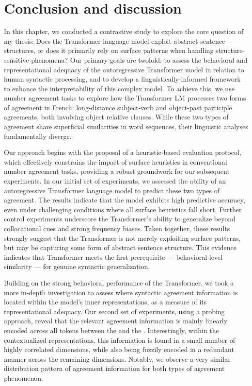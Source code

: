 \section{Conclusion and discussion} \label{sec:conclu_main_projct}
In this chapter, we conducted a contrastive study to explore the core question of my thesis: Does the Transformer language model exploit abstract sentence structures, or does it primarily rely on surface patterns when handling structure-sensitive phenomena? Our primary goals are twofold: to assess the behavioral and representational adequacy of the autoregressive Transformer model in relation to human syntactic processing, and to develop a linguistically-informed framework to enhance the interpretability of this complex model. To achieve this, we use number agreement tasks to explore how the Transformer LM processes two forms of agreement in French: long-distance subject-verb and object-past participle agreements, both involving object relative clauses. While these two types of agreement share superficial similarities in word sequences, their linguistic analyses fundamentally diverge.

Our approach begins with the proposal of a heuristic-based evaluation protocol, which effectively constrains the impact of surface heuristics in conventional number agreement tasks, providing a robust groundwork for our subsequent experiments. In our initial set of experiments, we assessed the ability of an autoregressive Transformer language model to predict these two types of agreement. The results indicate that the model exhibits high predictive accuracy, even under challenging conditions where all surface heuristics fall short. Further control experiments underscore the Transformer's ability to generalize beyond collocational cues and strong frequency biases. Taken together, these results strongly suggest that the Transformer is not merely exploiting surface patterns, but may be capturing some form of abstract sentence structure. This evidence indicates that Transformer meets the first prerequisite --- behavioral-level similarity --- for genuine syntactic generalization.


Building on the strong behavioral performance of the Transformer, we took a more in-depth investigation to assess where syntactic agreement information is located within the model's inner representations, as a measure of its representational adequacy. Our second set of experiments, using a probing approach, reveal that the relevant agreement information is mainly linearly encoded across all tokens between the \cue and the \target. Interestingly, within the contextualized representations, this information is found in a small number of highly correlated dimensions, while also being fuzzily encoded in a redundant manner across the remaining dimensions. Notably, we observe a very similar distribution pattern of agreement information for both types of agreement phenomenon.

